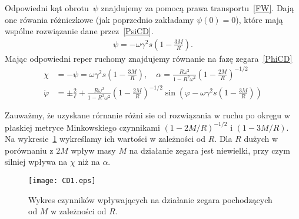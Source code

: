 Odpowiedni kąt obrotu~$\psi$ znajdujemy za pomocą prawa transportu~\eqref{FW}.
Dają one rówania różniczkowe (jak poprzednio zakładamy $\psi(0)=0$), 
które mają wspólne rozwiązanie dane przez~\eqref{PsiCD}.
\begin{align}\label{PsiCD}
\psi = - \omega \gamma^2 s \left( 1-\frac{3M}{R} \right).
\end{align}
Mając odpowiedni reper ruchomy znajdujemy równanie na 
fazę zegara~\eqref{PhiCD}
\begin{align}\nonumber
\chi &= - \psi =\omega \gamma^2 s \left( 1-\frac{3M}{R} \right)
 , \quad 
\alpha =  \frac{R\omega^2}{1-R^2\omega^2} 
\left( 1-\frac{2M}{R} \right)^{-1/2}
\\
\dot{\varphi} &= \pm \frac{2}{\ell} + \label{PsiCD}
\frac{R\omega^2}{1-R^2\omega^2} 
\left( 1-\frac{2M}{R} \right)^{-1/2}\sin \left(\varphi - 
\omega \gamma^2 s \left( 1-\frac{3M}{R} \right)
 \right)
\end{align}

Zauważmy, że uzyskane rórnanie różni sie od rozwiązania 
w ruchu po okręgu w płaskiej metryce Minkowskiego czynnikami
$\left( 1-2M/R \right)^{-1/2}$ i 
$ \left( 1-3M/R \right)$. Na wykresie~\ref{CD1plot} wykreślamy
 ich wartości w zależności od $R$. Dla $R$ dużych w porównaniu z 
$2M$ wpływ masy $M$ na działanie zegara jest niewielki, 
przy czym silniej wpływa na $\chi$ niż na $\alpha$.  
\begin{figure}
\centering
\texttt{[image: CD1.eps]}
\caption{Wykres czynników wpływających na działanie zegara 
pochodzących od $M$ w zależności od $R$.}{\label{CD1plot}}
\end{figure}

